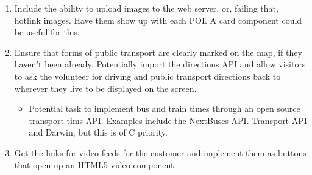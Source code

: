 \begin{enumerate}
	\item Include the ability to upload images to the web server, or, failing that, hotlink images. Have them show up with each POI. A card component could be useful for this.
	\item Ensure that forms of public transport are clearly marked on the map, if they haven't been already. Potentially import the directions API and allow visitors to ask the volunteer for driving and public transport directions back to wherever they live to be displayed on the screen.
		\begin{itemize}
			\item Potential task to implement bus and train times through an open source transport tims API. Examples include the NextBuses API. Transport API and Darwin, but this is of C priority.
		\end{itemize}
	\item  Get the links for video feeds for the customer and implement them as buttons that open up an HTML5 video component.
\end{enumerate}

